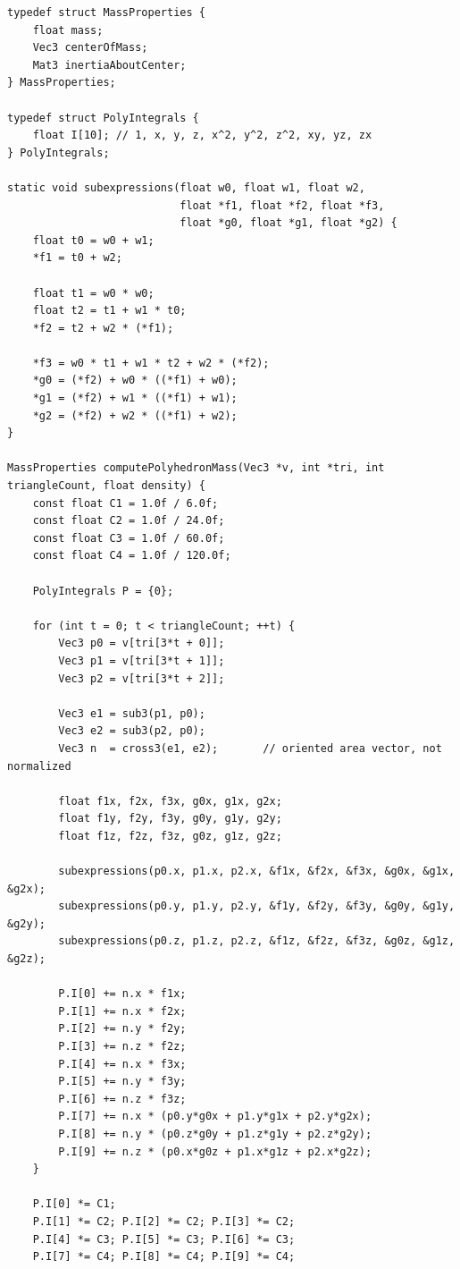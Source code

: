 \documentclass[10pt,letterpaper]{article}
\begin{document}
\begin{verbatim}
typedef struct MassProperties {
    float mass;
    Vec3 centerOfMass;
    Mat3 inertiaAboutCenter;
} MassProperties;

typedef struct PolyIntegrals {
    float I[10]; // 1, x, y, z, x^2, y^2, z^2, xy, yz, zx
} PolyIntegrals;

static void subexpressions(float w0, float w1, float w2,
                           float *f1, float *f2, float *f3,
                           float *g0, float *g1, float *g2) {
    float t0 = w0 + w1;
    *f1 = t0 + w2;

    float t1 = w0 * w0;
    float t2 = t1 + w1 * t0;
    *f2 = t2 + w2 * (*f1);

    *f3 = w0 * t1 + w1 * t2 + w2 * (*f2);
    *g0 = (*f2) + w0 * ((*f1) + w0);
    *g1 = (*f2) + w1 * ((*f1) + w1);
    *g2 = (*f2) + w2 * ((*f1) + w2);
}

MassProperties computePolyhedronMass(Vec3 *v, int *tri, int triangleCount, float density) {
    const float C1 = 1.0f / 6.0f;
    const float C2 = 1.0f / 24.0f;
    const float C3 = 1.0f / 60.0f;
    const float C4 = 1.0f / 120.0f;

    PolyIntegrals P = {0};

    for (int t = 0; t < triangleCount; ++t) {
        Vec3 p0 = v[tri[3*t + 0]];
        Vec3 p1 = v[tri[3*t + 1]];
        Vec3 p2 = v[tri[3*t + 2]];

        Vec3 e1 = sub3(p1, p0);
        Vec3 e2 = sub3(p2, p0);
        Vec3 n  = cross3(e1, e2);       // oriented area vector, not normalized

        float f1x, f2x, f3x, g0x, g1x, g2x;
        float f1y, f2y, f3y, g0y, g1y, g2y;
        float f1z, f2z, f3z, g0z, g1z, g2z;

        subexpressions(p0.x, p1.x, p2.x, &f1x, &f2x, &f3x, &g0x, &g1x, &g2x);
        subexpressions(p0.y, p1.y, p2.y, &f1y, &f2y, &f3y, &g0y, &g1y, &g2y);
        subexpressions(p0.z, p1.z, p2.z, &f1z, &f2z, &f3z, &g0z, &g1z, &g2z);

        P.I[0] += n.x * f1x;
        P.I[1] += n.x * f2x;
        P.I[2] += n.y * f2y;
        P.I[3] += n.z * f2z;
        P.I[4] += n.x * f3x;
        P.I[5] += n.y * f3y;
        P.I[6] += n.z * f3z;
        P.I[7] += n.x * (p0.y*g0x + p1.y*g1x + p2.y*g2x);
        P.I[8] += n.y * (p0.z*g0y + p1.z*g1y + p2.z*g2y);
        P.I[9] += n.z * (p0.x*g0z + p1.x*g1z + p2.x*g2z);
    }

    P.I[0] *= C1;
    P.I[1] *= C2; P.I[2] *= C2; P.I[3] *= C2;
    P.I[4] *= C3; P.I[5] *= C3; P.I[6] *= C3;
    P.I[7] *= C4; P.I[8] *= C4; P.I[9] *= C4;


\end{verbatim}
\end{document}
